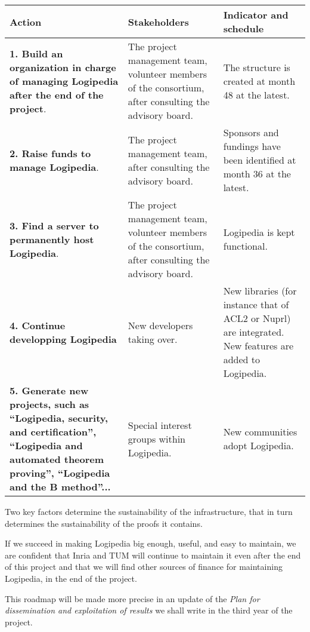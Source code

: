 \begin{longtable}{|p{}|p{}|p{}|}
\hline
{\bf Action}
&
{\bf Stakeholders}
&
{\bf Indicator and schedule}
\\
\hline
{\bf 1. Build an organization in charge of managing Logipedia
after the end of the project}.
&
The project management team, volunteer members of the consortium,
after consulting the advisory board.
&
The structure is created at month 48 at the latest.
\\
\hline
{\bf 2. Raise funds to manage Logipedia}.
&
The project management team, after consulting the advisory board.
&
Sponsors and fundings have been identified at month 36 at the latest.
\\
\hline   
{\bf 3. Find a server to permanently host Logipedia}.
&
The project management team, volunteer members of the consortium,
after consulting the advisory board.
&
Logipedia is kept functional.
\\
\hline
{\bf 4. Continue developping Logipedia}
&
New developers taking over.
&
New libraries (for instance that of ACL2 or Nuprl) are integrated.
New features are added to Logipedia.
\\
\hline
{\bf 5. Generate new projects, such as ``Logipedia, security, and
certification'', ``Logipedia and automated theorem proving'',
``Logipedia and the B method''...}
&
Special interest groups within Logipedia. 
&
New communities adopt Logipedia.
\\
\hline
\end{longtable}


Two key factors determine the sustainability of the infrastructure,
that in turn determines the sustainability of the proofs it contains.

If we succeed in making Logipedia big enough, useful, and easy to
maintain, we are confident that Inria and TUM will continue to
maintain it even after the end of this project and that we will find
other sources of finance for maintaining Logipedia, in the end of the
project.

This roadmap will be made more precise in an update of 
the {\em Plan for dissemination and exploitation of results} 
we shall write in the third year of the project.

